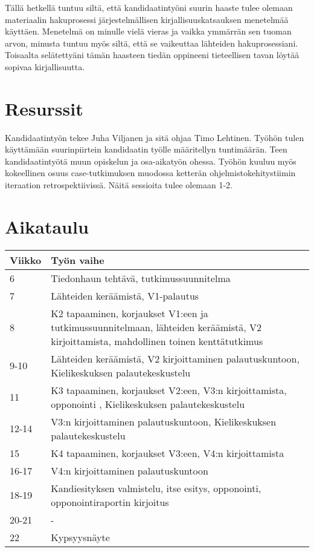 \documentclass[12pt,a4paper,finnish,oneside]{article}
\begin{document}
Tällä hetkellä tuntuu siltä, että kandidaatintyöni suurin haaste tulee olemaan materiaalin hakuprosessi järjestelmällisen kirjallisuuskatsauksen menetelmää käyttäen. Menetelmä on minulle vielä vieras ja vaikka ymmärrän sen tuoman arvon, minusta tuntuu myös siltä, että se vaikeuttaa lähteiden hakuprosessiani. Toisaalta selätettyäni tämän haasteen tiedän oppineeni tieteellisen tavan löytää sopivaa kirjallisuutta.

\section{Resurssit}

Kandidaatintyön tekee Juha Viljanen ja sitä ohjaa Timo Lehtinen. Työhön tulen käyttämään suurinpiirtein kandidaatin työlle määritellyn tuntimäärän. Teen kandidaatintyötä muun opiskelun ja osa-aikatyön ohessa.
Työhön kuuluu myös kokeellinen osuus case-tutkimuksen muodossa ketterän ohjelmistokehitystiimin iteraation retrospektiivissä. Näitä sessioita tulee olemaan 1-2.

\clearpage
\section{Aikataulu}

\begin{tabular}{|p{30mm}|p{120mm}|}
\hline
\bf{Viikko} & \bf{Työn vaihe} \\ \hline
6   & Tiedonhaun tehtävä, tutkimussuunnitelma \\ \hline
7   & Lähteiden keräämistä, V1-palautus \\ \hline
8  & K2 tapaaminen, korjaukset V1:een ja tutkimussuunnitelmaan, lähteiden keräämistä, V2 kirjoittamista, mahdollinen toinen kenttätutkimus \\ \hline
9-10 &  Lähteiden keräämistä, V2 kirjoittaminen palautuskuntoon, Kielikeskuksen palautekeskustelu \\ \hline
11 &  K3 tapaaminen, korjaukset V2:een, V3:n kirjoittamista, opponointi , Kielikeskuksen palautekeskustelu \\ \hline
12-14 & V3:n kirjoittaminen palautuskuntoon, Kielikeskuksen palautekeskustelu \\ \hline
15 & K4 tapaaminen, korjaukset V3:een, V4:n kirjoittamista \\ \hline
16-17 & V4:n kirjoittaminen palautuskuntoon \\ \hline
18-19 & Kandiesityksen valmistelu, itse esitys, opponointi, opponointiraportin kirjoitus \\ \hline
20-21 & - \\ \hline
22 & Kypsyysnäyte \\ \hline
\end{tabular}
\end{document}
